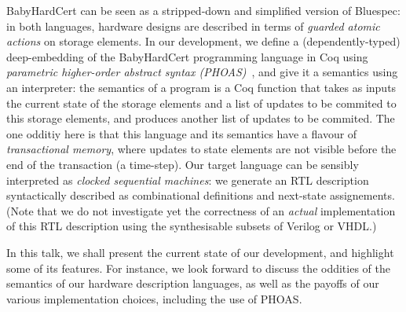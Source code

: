 \documentclass[a4]{article}
\newcommand\project{BabyHardCert}
\begin{document}
\project{} can be seen as a stripped-down and simplified version
of Bluespec: in both languages, hardware designs are described in
terms of \emph{guarded atomic actions} on storage elements. 
%
In our development, we define a (dependently-typed) deep-embedding of
the \project{} programming language in Coq using \emph{parametric
  higher-order abstract syntax (PHOAS)}~\cite{phoas-chlipala}, and
give it a semantics using an interpreter: the semantics of a program
is a Coq function that takes as inputs the current state of the
storage elements and a list of updates to be commited to this storage
elements, and produces another list of updates to be commited.
%
The one odditiy here is that this language and its semantics have a
flavour of \emph{transactional memory}, where updates to state
elements are not visible before the end of the transaction (a
time-step).
%
Our target language can be sensibly interpreted as \emph{clocked
  sequential machines}: we generate an RTL description syntactically
described as combinational definitions and next-state
assignements. (Note that we do not investigate yet the correctness of an
\emph{actual} implementation of this RTL description using the
synthesisable subsets of Verilog or VHDL.)

\medskip

In this talk, we shall present the current state of our development,
and highlight some of its features. For instance, we look forward to
discuss the oddities of the semantics of our hardware description
languages, as well as the payoffs of our various  implementation choices,
including the use of PHOAS. 

\newpage

\printbibliography
\end{document}
